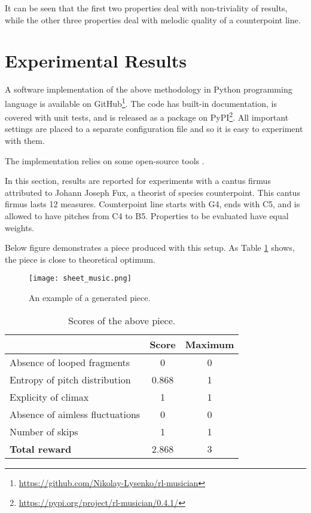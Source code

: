 \documentclass{article}
\begin{document}
It can be seen that the first two properties deal with non-triviality of results, while the other three properties deal with melodic quality of a counterpoint line. 


\section{Experimental Results}
\label{sec:results}

A software implementation of the above methodology in Python programming language is available on GitHub\footnote{\url{https://github.com/Nikolay-Lysenko/rl-musician}}. The code has built-in documentation, is covered with unit tests, and is released as a package on PyPI\footnote{\url{https://pypi.org/project/rl-musician/0.4.1/}}. All important settings are placed to a separate configuration file and so it is easy to experiment with them.

The implementation relies on some open-source tools \cite{brockman2016openai,oliphant2006guide,raffel2014intuitive}.

In this section, results are reported for experiments with a cantus firmus attributed to Johann Joseph Fux, a theorist of species counterpoint. This cantus firmus lasts 12 measures. Counterpoint line starts with G4, ends with C5, and is allowed to have pitches from C4 to B5. Properties to be evaluated have equal weights.

Below figure demonstrates a piece produced with this setup. As Table \ref{table:scores} shows, the piece is close to theoretical optimum.

\begin{figure}[h!]
	\label{image:sheet}
	\caption{An example of a generated piece.}
	\centering
	\texttt{[image: sheet\_music.png]}
\end{figure}

\begin{table}[h!]
	\caption{Scores of the above piece.}
	\label{table:scores}
	\begin{center}
		\begin{tabular}{|l|c|c|}
			\hline
			& Score & Maximum\\
			\hline
			Absence of looped fragments & 0 & 0\\
			\hline
			Entropy of pitch distribution & 0.868 & 1\\
			\hline
			Explicity of climax & 1 & 1\\
			\hline
			Absence of aimless fluctuations & 0 & 0\\
			\hline
			Number of skips & 1 & 1\\
			\hline
			\textbf{Total reward} & 2.868 & 3\\
			\hline
		\end{tabular}
	\end{center}
\end{table}
\end{document}
